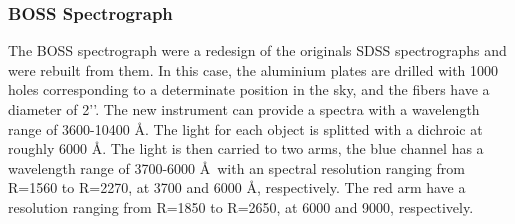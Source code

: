 \subsubsection{BOSS Spectrograph}
\label{sec2:boss}

The BOSS spectrograph were a redesign of the originals SDSS spectrographs and were rebuilt from them. In this case, the aluminium plates are drilled with 1000 holes corresponding to a determinate position in the sky, and the fibers have a diameter of 2’’. The new instrument can provide a spectra with a wavelength range of 3600-10400 \AA. The light for each object is splitted with a dichroic at roughly 6000 \AA. The light is then carried to two arms, the blue channel has a wavelength range of 3700-6000 \AA~with an spectral resolution ranging from R=1560 to R=2270, at 3700 and 6000 \AA, respectively. The red arm have a resolution ranging from R=1850 to R=2650, at 6000 and 9000, respectively. 

